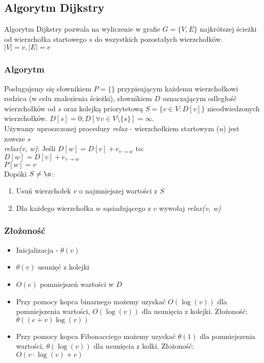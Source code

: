 \documentclass[main.tex]{subfiles}
\begin{document}
    \subsection{Algorytm Dijkstry}

    Algorytm Dijkstry pozwala na wyliczenie w grafie $G = \{V, E\}$ najkrótszej ścieżki od wierzchołka
    startowego $s$ do wszystkich pozostałych wierzchołków. $|V| = v, |E| = e$

    \subsubsection{Algorytm}

    Posługujemy się słownikiem $P = \{\}$ przypisującym każdemu wierzchołkowi
    rodzica (w celu znalezienia ścieżki), słownikiem $D$ oznaczającym odległość
    wierzchołków od $s$ oraz kolejką priorytetową $S = \{v \in V : D[v]\}$ nieodwiedzonych
    wierzchołków. $D[s] = 0; D[\forall v \in V \setminus \{s\}] = \infty$.
    \[\]
    Używamy uproszczonej procedury \textit{relax} - wierzchołkiem startowym ($u$) jest zawsze $s$
    \[\]
    \textit{relax(v, w)}:
    \vskip 0pt Jeśli $D[w] = D[v] + e_{v \rightarrow w}$ to:\\
    \hspace*{1cm} $D[w] = D[v] + e_{v \rightarrow w}$ \\
    \hspace*{1cm} $P[w] = v$ \\

    \[\]
    Dopóki $S \neq \o$:
    \begin{enumerate}
        \item Usuń wierzchołek $v$ o najmniejszej wartości z $S$
        \item Dla każdego wierzchołka $w$ sąsiadującego z $v$ wywołaj \textit{relax(v, w)}
    \end{enumerate}

    \subsubsection{Złożoność}

    \begin{itemize}
        \item Inicjalizacja - $\theta(v)$
        \item $\theta(v)$ usunięć z kolejki
        \item $O(e)$ pomniejszeń wartości w $D$
        \item Przy pomocy kopca binarnego możemy uzyskać $O(\log(v))$ dla pomniejszenia
        wartości, $O(\log(v))$ dla usunięcia z kolejki. Złożoność:
        $\theta((e + v)\log(v))$

        \item Przy pomocy kopca Fibonacciego możemy uzyskać $\theta(1)$ dla pomniejszenia
        wartości, $\theta(\log (v))$ dla usunięcia z kolki. Złożoność:
        $O(v \cdot \log(v) + e)$
    \end{itemize}
\end{document}
